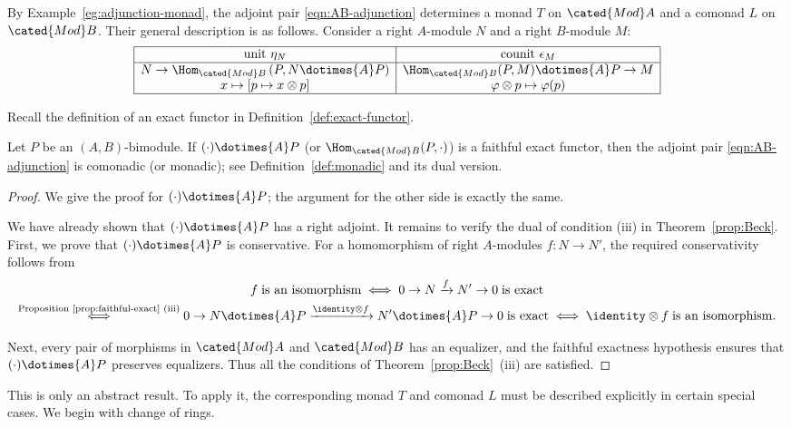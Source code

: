 By Example~\ref{eg:adjunction-monad}, the adjoint pair
\eqref{eqn:AB-adjunction} determines a monad $T$ on $\cated{Mod}A$ and a
comonad $L$ on $\cated{Mod}B$. Their general description is as follows.
Consider a right $A$-module $N$ and a right $B$-module $M$:
\begin{equation}\label{eqn:bimod-adjunction}
	\begin{array}{|c|c|} \hline
		\text{unit } \eta_N & \text{counit } \epsilon_M \\ \hline
		N \to \Hom_{\cated{Mod}B}\left( P, N \dotimes{A} P \right) & \Hom_{\cated{Mod}B}(P, M) \dotimes{A} P \to M \\
		x \mapsto \left[ p \mapsto x \otimes p \right] & \varphi \otimes p \mapsto \varphi(p) \\ \hline
	\end{array}
\end{equation}

Recall the definition of an exact functor in
Definition~\ref{def:exact-functor}.

\begin{proposition}\label{prop:Morita-descent}
	Let $P$ be an $(A,B)$-bimodule. If
	$(\mathord\cdot)\dotimes{A}P$ (or
	$\Hom_{\cated{Mod}B}(P,\mathord\cdot)$) is a faithful exact functor, then
	the adjoint pair \eqref{eqn:AB-adjunction} is comonadic (or monadic); see
	Definition~\ref{def:monadic} and its dual version.
\end{proposition}
\begin{proof}
	We give the proof for $(\mathord\cdot)\dotimes{A}P$; the argument for the
	other side is exactly the same.

	We have already shown that $(\mathord\cdot)\dotimes{A}P$ has a right
	adjoint. It remains to verify the dual of condition (iii) in
	Theorem~\ref{prop:Beck}. First, we prove that
	$(\mathord\cdot)\dotimes{A}P$ is conservative. For a homomorphism of
	right $A$-modules $f:N\to N'$, the required conservativity follows from
	\begin{multline*}
		f \;\text{is an isomorphism} \iff 0 \to N \xrightarrow{f} N' \to 0 \;\text{is exact} \\
		\stackrel{\text{Proposition \ref{prop:faithful-exact} (iii)}}{\iff} 0 \to N \dotimes{A} P \xrightarrow{\identity \otimes f} N' \dotimes{A} P \to 0 \;\text{is exact} \iff \identity \otimes f \;\text{is an isomorphism}.
	\end{multline*}

	Next, every pair of morphisms in $\cated{Mod}A$ and $\cated{Mod}B$ has an
	equalizer, and the faithful exactness hypothesis ensures that
	$(\mathord\cdot)\dotimes{A}P$ preserves equalizers. Thus all the
	conditions of Theorem~\ref{prop:Beck}~(iii) are satisfied.
\end{proof}

This is only an abstract result. To apply it, the corresponding monad $T$ and
comonad $L$ must be described explicitly in certain special cases. We begin
with change of rings.
